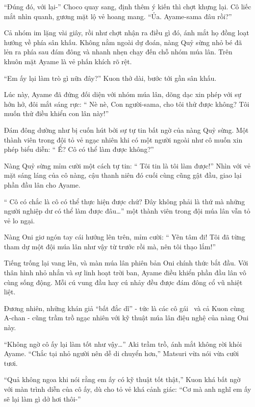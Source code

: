 \documentclass[../main.tex]{subfiles}
\begin{document}
``Đúng đó, với lại-'' Choco quay sang, định thêm ý kiến thì chợt khựng lại. Cô liếc mắt nhìn quanh, gương mặt lộ vẻ hoang mang. ``Ủa. Ayame-sama đâu rồi?''

Cả nhóm im lặng vài giây, rồi như chợt nhận ra điều gì đó, ánh mắt họ đồng loạt hướng về phía sân khấu. Không nằm ngoài dự đoán, nàng Quỷ sừng nhỏ bé đã lẻn ra phía sau đám đông và nhanh nhẹn chạy đến chỗ nhóm múa lân. Trên khuôn mặt Ayame là vẻ phấn khích rõ rệt.

``Em ấy lại làm trò gì nữa đây?'' Kuon thở dài, bước tới gần sân khấu.

Lúc này, Ayame đã đứng đối diện với nhóm múa lân, dõng dạc xin phép với sự hớn hở, đôi mắt sáng rực: ``{\color{red} Nè nè, Con người-sama, cho tôi thử được không? Tôi muốn thử điều khiển con lân này!}''

Đám đông dường như bị cuốn hút bởi sự tự tin bất ngờ của nàng Quỷ sừng. Một thành viên trong đội tỏ vẻ ngạc nhiên khi có một người ngoài như cô muốn xin phép biểu diễn: ``{\color{red} Ể? Cô có thể làm được không}?''

Nàng Quỷ sừng mỉm cười một cách tự tin: ``{\color{red} Tôi tin là tôi làm được!}'' Nhìn với vẻ mặt sáng láng của cô nàng, cậu thanh niên đó cuối cùng cũng gật đầu, giao lại phần đầu lân cho Ayame.

``{\color{red} Cô có chắc là cô có thể thực hiện được chứ? Đây không phải là thứ mà những người nghiệp dư có thể làm được đâu\dots}'' một thành viên trong đội múa lân vẫn tỏ vẻ lo ngại.

Nàng Oni giơ ngón tay cái hướng lên trên, mỉm cười: ``{\color{red} Yên tâm đi! Tôi đã từng tham dự một đội múa lân như vậy từ trước rồi mà, nên tôi thạo lắm!}''

Tiếng trống lại vang lên, và màn múa lân phiên bản Oni chính thức bắt đầu. Với thân hình nhỏ nhắn và sự linh hoạt trời ban, Ayame điều khiển phần đầu lân vô cùng sống động. Mỗi cú vung đầu hay cú nhảy đều được đám đông cổ vũ nhiệt liệt.

Đương nhiên, những khán giả ``bất đắc dĩ'' - tức là các cô gái \hll\ và cả Kuon cùng A-chan - cũng trầm trồ ngạc nhiên với kỹ thuật múa lân điệu nghệ của nàng Oni này.

``Không ngờ cô ấy lại làm tốt như vậy\dots'' Aki trầm trồ, ánh mắt không rời khỏi Ayame. ``Chắc tại nhỏ người nên dễ di chuyển hơn,'' Matsuri vừa nói vừa cười tươi.

``Quả không ngoa khi nói rằng em ấy có kỹ thuật tốt thật,'' Kuon khá bất ngờ với màn trình diễn của cô ấy, dù cho tỏ vẻ khá cảnh giác: ``Cơ mà anh nghĩ em ấy sẽ lại làm gì dở hơi thôi-''
\end{document}
